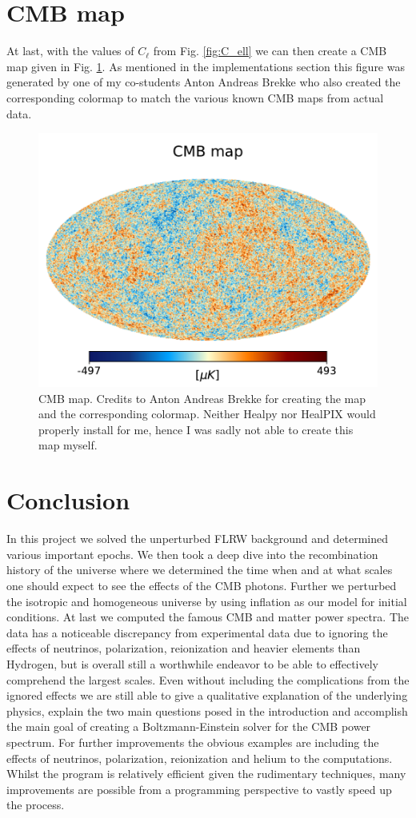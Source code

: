 \documentclass[%
reprint,
 amsmath,amssymb,
 aps,
]{revtex4-2}
\begin{document}
\section{CMB map}
At last, with the values of $C_\ell$ from Fig. \ref{fig:C_ell} we can then create a CMB map given in Fig. \ref{fig:CMB_map}. As mentioned in the implementations section this figure was generated by one of my co-students Anton Andreas Brekke who also created the corresponding colormap to match the various known CMB maps from actual data. 
\begin{figure}[ht!]
	\includegraphics[width = 0.7\linewidth]{Milestone4/Figures/CMB_map.pdf}
	\caption{CMB map. Credits to Anton Andreas Brekke for creating the map and the corresponding colormap. Neither Healpy nor HealPIX would properly install for me, hence I was sadly not able to create this map myself.}
	\label{fig:CMB_map}
\end{figure}

\section{Conclusion}
In this project we solved the unperturbed FLRW background and determined various important epochs. We then took a deep dive into the recombination history of the universe where we determined the time when and at what scales one should expect to see the effects of the CMB photons. Further we perturbed the isotropic and homogeneous universe by using inflation as our model for initial conditions. At last we computed the famous CMB and matter power spectra. The data has a noticeable discrepancy from experimental data due to ignoring the effects of neutrinos, polarization, reionization and heavier elements than Hydrogen, but is overall still a worthwhile endeavor to be able to effectively comprehend the largest scales. Even without including the complications from the ignored effects we are still able to give a qualitative explanation of the underlying physics, explain the two main questions posed in the introduction and accomplish the main goal of creating a Boltzmann-Einstein solver for the CMB power spectrum. For further improvements the obvious examples are including the effects of neutrinos, polarization, reionization and helium to the computations. Whilst the program is relatively efficient given the rudimentary techniques, many improvements are possible from a programming perspective to vastly speed up the process. 
\end{document}
